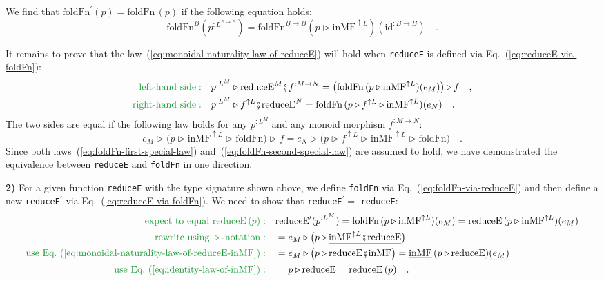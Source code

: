 We find that $\text{foldFn}^{\prime}(p)=\text{foldFn}\,(p)$ if the
following equation holds:
\begin{equation}
\text{foldFn}^{B}(p^{:L^{B\rightarrow B}})=\text{foldFn}^{B\rightarrow B}(p\triangleright\text{inMF}^{\uparrow L})(\text{id}^{:B\rightarrow B})\quad.\label{eq:foldFn-first-special-law}
\end{equation}

It remains to prove that the law~(\ref{eq:monoidal-naturality-law-of-reduceE})
will hold when \lstinline!reduceE! is defined via Eq.~(\ref{eq:reduceE-via-foldFn}):
\begin{align*}
{\color{greenunder}\text{left-hand side}:}\quad & p^{:L^{M}}\triangleright\text{reduceE}^{M}\bef f^{:M\rightarrow N}=\big(\text{foldFn}\,(p\triangleright\text{inMF}^{\uparrow L})(e_{M})\big)\triangleright f\quad,\\
{\color{greenunder}\text{right-hand side}:}\quad & p^{:L^{M}}\triangleright f^{\uparrow L}\bef\text{reduceE}^{N}=\text{foldFn}\,(p\triangleright f^{\uparrow L}\triangleright\text{inMF}^{\uparrow L})(e_{N})\quad.
\end{align*}
The two sides are equal if the following law holds for any $p^{:L^{M}}$
and any monoid morphism $f^{:M\rightarrow N}$:
\begin{equation}
e_{M}\triangleright\big(p\triangleright\text{inMF}^{\uparrow L}\triangleright\text{foldFn}\big)\triangleright f=e_{N}\triangleright\big(p\triangleright f^{\uparrow L}\triangleright\text{inMF}^{\uparrow L}\triangleright\text{foldFn}\big)\quad.\label{eq:foldFn-second-special-law}
\end{equation}
Since both laws~(\ref{eq:foldFn-first-special-law}) and~(\ref{eq:foldFn-second-special-law})
are assumed to hold, we have demonstrated the equivalence between
\lstinline!reduceE! and \lstinline!foldFn! in one direction.

\textbf{2)} For a given function \lstinline!reduceE! with the type
signature shown above, we define \lstinline!foldFn! via Eq.~(\ref{eq:foldFn-via-reduceE})
and then define a new \lstinline!reduceE!$^{\prime}$ via Eq.~(\ref{eq:reduceE-via-foldFn}).
We need to show that \lstinline!reduceE!$^{\prime}=$ \lstinline!reduceE!:
\begin{align*}
{\color{greenunder}\text{expect to equal }\text{reduceE}\left(p\right):}\quad & \text{reduceE}^{\prime}(p^{:L^{M}})=\text{foldFn}\,(p\triangleright\text{inMF}^{\uparrow L})(e_{M})=\text{reduceE}\,(p\triangleright\text{inMF}^{\uparrow L})(e_{M})\\
{\color{greenunder}\text{rewrite using }\triangleright\text{-notation}:}\quad & =e_{M}\triangleright\big(p\triangleright\gunderline{\text{inMF}^{\uparrow L}\bef\text{reduceE}}\big)\\
{\color{greenunder}\text{use Eq.~(\ref{eq:monoidal-naturality-law-of-reduceE-inMF})}:}\quad & =e_{M}\triangleright\big(p\triangleright\text{reduceE}\bef\text{inMF}\big)=\gunderline{\text{inMF}}\,(p\triangleright\text{reduceE})\gunderline{(e_{M})}\\
{\color{greenunder}\text{use Eq.~(\ref{eq:identity-law-of-inMF})}:}\quad & =p\triangleright\text{reduceE}=\text{reduceE}\,(p)\quad.
\end{align*}

